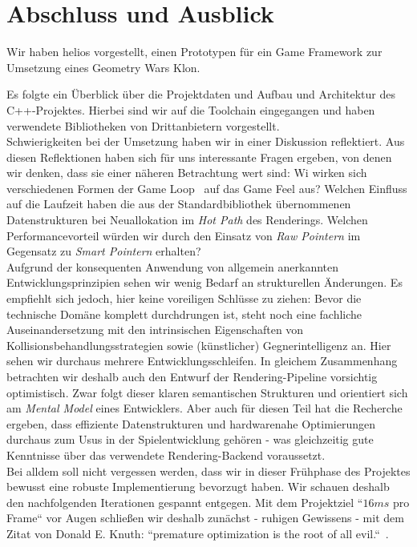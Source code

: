 \section{Abschluss und Ausblick}

Wir haben helios vorgestellt, einen Prototypen für ein Game Framework zur Umsetzung eines Geometry Wars Klon.

Es folgte ein Überblick über die Projektdaten und Aufbau und Architektur des C++-Projektes.
Hierbei sind wir auf die Toolchain eingegangen und haben verwendete Bibliotheken von Drittanbietern vorgestellt.\\

Schwierigkeiten bei der Umsetzung haben wir in einer Diskussion reflektiert.
Aus diesen Reflektionen haben sich für uns interessante Fragen ergeben, von denen wir denken, dass sie einer näheren Betrachtung wert sind: Wi wirken sich verschiedenen Formen der Game Loop~\cite[534 ff.]{Gre19} auf das Game Feel aus?
Welchen Einfluss auf die Laufzeit haben die aus der Standardbibliothek übernommenen Datenstrukturen bei Neuallokation im \textit{Hot Path} des Renderings.
Welchen Performancevorteil würden wir durch den Einsatz von \textit{Raw Pointern} im Gegensatz zu \textit{Smart Pointern} erhalten?\\

Aufgrund der konsequenten Anwendung von allgemein anerkannten Entwicklungsprinzipien sehen wir wenig Bedarf an strukturellen Änderungen.
Es empfiehlt sich jedoch, hier keine voreiligen Schlüsse zu ziehen: Bevor die technische Domäne komplett durchdrungen ist, steht noch eine fachliche Auseinandersetzung mit den intrinsischen Eigenschaften von Kollisionsbehandlungsstrategien sowie (künstlicher) Gegnerintelligenz an.
Hier sehen wir durchaus mehrere Entwicklungsschleifen.
In gleichem Zusammenhang betrachten wir deshalb auch den Entwurf der Rendering-Pipeline vorsichtig optimistisch.
Zwar folgt dieser klaren semantischen Strukturen und orientiert sich am \textit{Mental Model} eines Entwicklers.
Aber auch für diesen Teil hat die Recherche ergeben, dass effiziente Datenstrukturen und hardwarenahe Optimierungen durchaus zum Usus in der Spielentwicklung gehören - was gleichzeitig gute Kenntnisse über das verwendete Rendering-Backend voraussetzt.\\

Bei alldem soll nicht vergessen werden, dass wir in dieser Frühphase des Projektes bewusst eine robuste Implementierung bevorzugt haben.
Wir schauen deshalb den nachfolgenden Iterationen gespannt entgegen.
Mit dem Projektziel ``$16ms$  pro Frame`` vor Augen schließen wir deshalb zunächst - ruhigen Gewissens - mit dem Zitat von Donald E. Knuth: ``premature optimization is the root of all evil.``~\cite[]{Knu74}.

